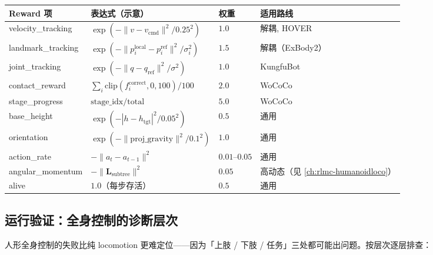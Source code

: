 \begin{center}
\small
\begin{tabular}{p{2.8cm}p{4.2cm}p{1.4cm}p{2.4cm}}
\hline
Reward 项 & 表达式（示意） & 权重 & 适用路线 \\
\hline
velocity\_tracking & $\exp(-\lVert v - v_{\mathrm{cmd}}\rVert^2/0.25^2)$ & $1.0$ & 解耦, HOVER \\
landmark\_tracking & $\exp(-\lVert p_i^{\mathrm{local}} - p_i^{\mathrm{ref}}\rVert^2/\sigma_i^2)$ & $1.5$ & 解耦（ExBody2） \\
joint\_tracking & $\exp(-\lVert q - q_{\mathrm{ref}}\rVert^2/\sigma^2)$ & $1.0$ & KungfuBot \\
contact\_reward & $\sum_i \mathrm{clip}(f_i^{\mathrm{correct}},0,100)/100$ & $2.0$ & WoCoCo \\
stage\_progress & $\mathrm{stage\_idx}/\mathrm{total}$ & $5.0$ & WoCoCo \\
base\_height & $\exp(-|h - h_{\mathrm{tgt}}|^2/0.05^2)$ & $0.5$ & 通用 \\
orientation & $\exp(-\lVert \mathrm{proj\_gravity}\rVert^2/0.1^2)$ & $1.0$ & 通用 \\
action\_rate & $-\lVert a_t - a_{t-1}\rVert^2$ & $0.01$--$0.05$ & 通用 \\
angular\_momentum & $-\lVert \mathbf{L}_{\mathrm{subtree}}\rVert^2$ & $0.05$ & 高动态（见 \cref{ch:rlmc-humanoidloco}） \\
alive & $1.0$（每步存活） & $0.5$ & 通用 \\
\hline
\end{tabular}
\end{center}


\subsection{运行验证：全身控制的诊断层次}
人形全身控制的失败比纯 locomotion 更难定位——因为「上肢 / 下肢 / 任务」三处都可能出问题。按层次逐层排查：

